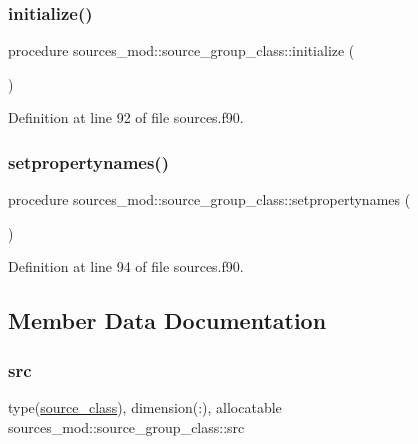\subsubsection{\texorpdfstring{initialize()}{initialize()}}
{\footnotesize\ttfamily procedure sources\+\_\+mod\+::source\+\_\+group\+\_\+class\+::initialize (\begin{DoxyParamCaption}{ }\end{DoxyParamCaption})\hspace{0.3cm}{\ttfamily [private]}}



Definition at line 92 of file sources.\+f90.

\mbox{\label{structsources__mod_1_1source__group__class_afcd9f3654f50966bc72ffc32b4bee7dd}} 
\subsubsection{\texorpdfstring{setpropertynames()}{setpropertynames()}}
{\footnotesize\ttfamily procedure sources\+\_\+mod\+::source\+\_\+group\+\_\+class\+::setpropertynames (\begin{DoxyParamCaption}{ }\end{DoxyParamCaption})\hspace{0.3cm}{\ttfamily [private]}}



Definition at line 94 of file sources.\+f90.



\subsection{Member Data Documentation}
\mbox{\label{structsources__mod_1_1source__group__class_af970ce2c935528f707bdbf4169995d7c}} 
\subsubsection{\texorpdfstring{src}{src}}
{\footnotesize\ttfamily type(\mbox{\hyperlink{structsources__mod_1_1source__class}{source\+\_\+class}}), dimension(\+:), allocatable sources\+\_\+mod\+::source\+\_\+group\+\_\+class\+::src\hspace{0.3cm}{\ttfamily [private]}}




